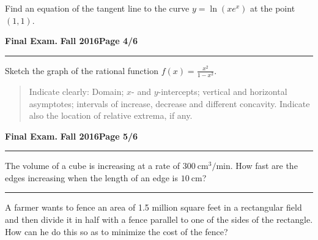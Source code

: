 \documentclass[12pt]{article}
\theoremstyle{definition}
\begin{document}
{{{\problem[10 pts] Find an equation of the tangent line to the curve
$y=\ln( x e^x)$ at the point $(1,1)$.}
\vspace{8cm}
\begin{flushright}
\end{flushright}

\newpage

\hfill{\large\bf Final Exam.}\hfill{\large\bf
  Fall 2016}\hfill{\large\bf Page 4/6}\hrule

\bigskip
{\problem[20 pts] Sketch the graph of the rational function $f(x)
  = \displaystyle{\frac{x^2}{1-x^2}}$.}
\begin{quotation}
{\small \noindent
Indicate clearly: Domain; $x$- and $y$-intercepts; vertical and horizontal asymptotes; intervals of increase, decrease and different concavity. Indicate also the location of relative extrema, if any.}
\end{quotation}

\newpage

\hfill{\large\bf Final Exam.}\hfill{\large\bf
  Fall 2016}\hfill{\large\bf Page 5/6}\hrule
  
\bigskip

{\problem[10 pts] The volume of a cube is increasing at a rate of
  $300~\text{cm}^3/\text{min}$.  How fast are the edges increasing
  when the length of an edge is $10~\text{cm}$?}
\vspace{8cm}
\begin{flushright}
\end{flushright}
\hrule
{\problem[10 pts] A farmer wants to fence an area of 1.5 million square feet in a rectangular field and then divide it in half with a fence parallel to one of the sides of the rectangle.  How can he do this so as to minimize the cost of the fence?}
\vspace{8cm}
\begin{flushright}
\end{flushright}
\newpage

}}
\end{document}
